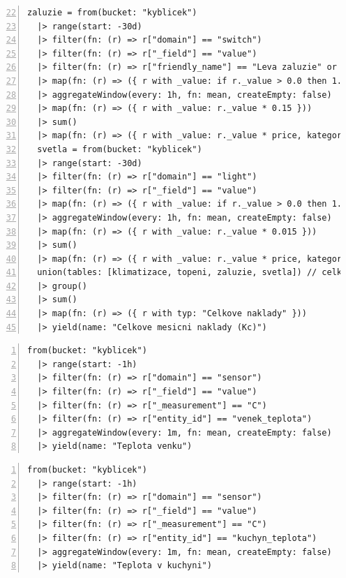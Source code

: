 \begin{lstlisting}[language=flux, breaklines=true, numbers=left, firstnumber=22, numberstyle=\small, numbersep=10pt, frame=single, basicstyle=\ttfamily\small]
zaluzie = from(bucket: "kyblicek")
  |> range(start: -30d)
  |> filter(fn: (r) => r["domain"] == "switch")
  |> filter(fn: (r) => r["_field"] == "value")
  |> filter(fn: (r) => r["friendly_name"] == "Leva zaluzie" or r["friendly_name"] == "Prava zaluzie")
  |> map(fn: (r) => ({ r with _value: if r._value > 0.0 then 1.0 else 0.0 }))
  |> aggregateWindow(every: 1h, fn: mean, createEmpty: false)
  |> map(fn: (r) => ({ r with _value: r._value * 0.15 }))
  |> sum()
  |> map(fn: (r) => ({ r with _value: r._value * price, kategorie: "Zaluzie" }))
  svetla = from(bucket: "kyblicek")
  |> range(start: -30d)
  |> filter(fn: (r) => r["domain"] == "light")
  |> filter(fn: (r) => r["_field"] == "value")
  |> map(fn: (r) => ({ r with _value: if r._value > 0.0 then 1.0 else 0.0 }))
  |> aggregateWindow(every: 1h, fn: mean, createEmpty: false)
  |> map(fn: (r) => ({ r with _value: r._value * 0.015 }))
  |> sum()
  |> map(fn: (r) => ({ r with _value: r._value * price, kategorie: "Svetla" }))
  union(tables: [klimatizace, topeni, zaluzie, svetla]) // celkova sumu
  |> group()
  |> sum()
  |> map(fn: (r) => ({ r with typ: "Celkove naklady" }))
  |> yield(name: "Celkove mesicni naklady (Kc)")
\end{lstlisting}
\pagebreak
\begin{lstlisting}[language=flux, breaklines=true, numbers=left, numberstyle=\small, numbersep=10pt, frame=single, basicstyle=\ttfamily\small, caption={Grafana - Průběh teploty - Query A}, label={lst:grafanaTeplota}]
from(bucket: "kyblicek")
  |> range(start: -1h)
  |> filter(fn: (r) => r["domain"] == "sensor")
  |> filter(fn: (r) => r["_field"] == "value")
  |> filter(fn: (r) => r["_measurement"] == "C")
  |> filter(fn: (r) => r["entity_id"] == "venek_teplota")
  |> aggregateWindow(every: 1m, fn: mean, createEmpty: false)
  |> yield(name: "Teplota venku")
\end{lstlisting}
\begin{lstlisting}[language=flux, breaklines=true, numbers=left, numberstyle=\small, numbersep=10pt, frame=single, basicstyle=\ttfamily\small, caption={Grafana - Průběh teploty - Query B}, label={lst:grafanaTeplota}]
from(bucket: "kyblicek")
  |> range(start: -1h)
  |> filter(fn: (r) => r["domain"] == "sensor")
  |> filter(fn: (r) => r["_field"] == "value")
  |> filter(fn: (r) => r["_measurement"] == "C")
  |> filter(fn: (r) => r["entity_id"] == "kuchyn_teplota")
  |> aggregateWindow(every: 1m, fn: mean, createEmpty: false)
  |> yield(name: "Teplota v kuchyni")
\end{lstlisting}

